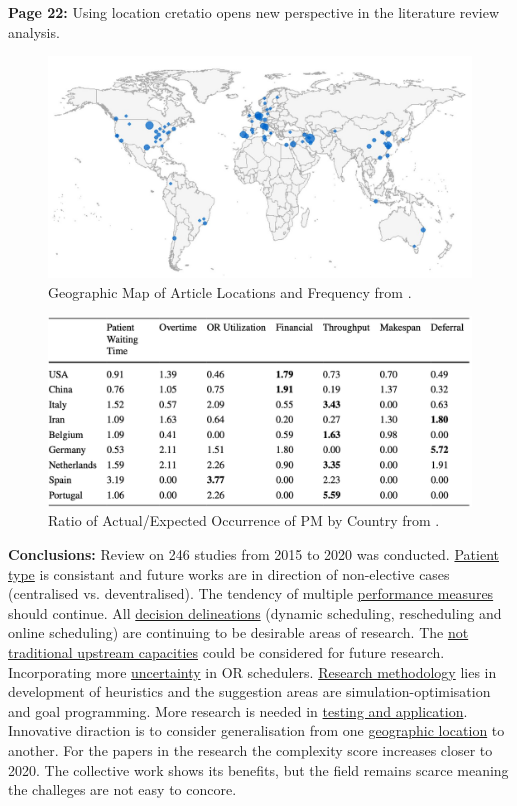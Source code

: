     \textbf{Page 22:}
    Using location cretatio opens new perspective in the literature review analysis.
    \begin{figure}[H]
        \centering
        \includegraphics[width=1\textwidth]{figures/0002_SR02US22/fig4.png}
        \caption{Geographic Map of Article Locations and Frequency from \cite{x079}.}
        \label{fig4:SR02US22}
    \end{figure}
    \begin{figure}[H]
        \centering
        \includegraphics[width=1\textwidth]{figures/0002_SR02US22/fig5.png}
        \caption{Ratio of Actual/Expected Occurrence of PM by Country from \cite{x079}.}
        \label{fig5:SR02US22}
    \end{figure}
    
    \textbf{Conclusions:}
    Review on 246 studies from 2015 to 2020 was conducted. \underline{Patient type} is consistant and future works are in direction of non-elective cases (centralised vs. deventralised). The tendency of multiple \underline{performance measures} should continue. All \underline{decision delineations} (dynamic scheduling, rescheduling and online scheduling) are continuing to be desirable areas of research. The \underline{not traditional upstream capacities} could be considered for future research. Incorporating more \underline{uncertainty} in OR schedulers. \underline{Research methodology} lies in development of heuristics and the suggestion areas are simulation-optimisation and goal programming. More research is needed in \underline{testing and application}. Innovative diraction is to consider generalisation from one \underline{geographic location} to another. For the papers in the research the complexity score increases closer to 2020. The collective work shows its benefits, but the field remains scarce meaning the challeges are not easy to concore.